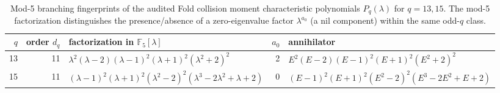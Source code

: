 \begin{table}[H]
\centering
\scriptsize
\setlength{\tabcolsep}{5pt}
\caption{Mod-5 branching fingerprints of the audited Fold collision moment characteristic polynomials $P_q(\lambda)$ for $q=13,15$. The mod-5 factorization distinguishes the presence/absence of a zero-eigenvalue factor $\lambda^{a_0}$ (a nil component) within the same odd-$q$ class.}
\label{tab:fold_collision_charpoly_mod5_branch_q13_15}
\begin{tabular}{r r l r l}
\toprule
$q$ & order $d_q$ & factorization in $\mathbb{F}_5[\lambda]$ & $a_0$ & annihilator\\
\midrule
13 & 11 & $\lambda^{2} \left(\lambda - 2\right) \left(\lambda - 1\right)^{2} \left(\lambda + 1\right)^{2} \left(\lambda^{2} + 2\right)^{2}$ & 2 & $E^{2} \left(E - 2\right) \left(E - 1\right)^{2} \left(E + 1\right)^{2} \left(E^{2} + 2\right)^{2}$\\
15 & 11 & $\left(\lambda - 1\right)^{2} \left(\lambda + 1\right)^{2} \left(\lambda^{2} - 2\right)^{2} \left(\lambda^{3} - 2 \lambda^{2} + \lambda + 2\right)$ & 0 & $\left(E - 1\right)^{2} \left(E + 1\right)^{2} \left(E^{2} - 2\right)^{2} \left(E^{3} - 2 E^{2} + E + 2\right)$\\
\bottomrule
\end{tabular}
\end{table}
